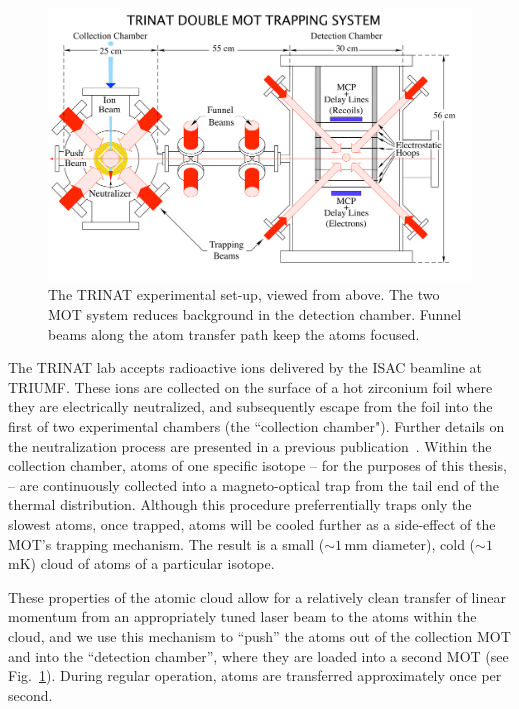 \begin{figure}[t!h]
	\centering
	\includegraphics[width=.999\linewidth]
	{Figures/doublemot4.pdf}
	\caption{The TRINAT experimental set-up, viewed from above.  The two MOT system reduces background in the detection chamber.  Funnel beams along the atom transfer path keep the atoms focused.}	
	\label{fig:doublemot}
\end{figure}

The TRINAT lab accepts radioactive ions delivered by the ISAC beamline at TRIUMF.  These ions are collected on the surface of a hot zirconium foil where they are electrically neutralized, and subsequently escape from the foil into the first of two experimental chambers (the ``collection chamber").  Further details on the neutralization process are presented in a previous publication~\cite{gorelov2000}.  Within the collection chamber, atoms of one specific isotope -- for the purposes of this thesis,   -- are continuously collected into a magneto-optical trap 
from the tail end of the thermal distribution.  Although this procedure preferrentially traps only the slowest atoms, once trapped, atoms will be cooled further as a side-effect of the MOT's trapping mechanism.  The result is a small ($\sim\!1\,$mm diameter), cold ($\sim\!1\,$mK) cloud of atoms of a particular isotope.  

These properties of the atomic cloud allow for a relatively clean transfer of linear momentum from an appropriately tuned laser beam to the atoms within the cloud, and we use this mechanism to ``push'' the atoms out of the collection MOT and into the ``detection chamber'', where they are loaded into a second MOT (see Fig.~\ref{fig:doublemot}).  During regular operation, atoms are transferred approximately once per second.  

